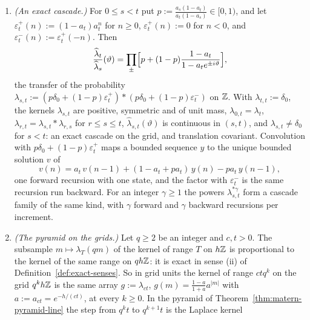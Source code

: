 \begin{proposition}
\[\]
\begin{enumerate}
\item \emph{(An exact cascade.)} For $0 \le s < t$ put
$p := \tfrac{a_s(1-a_t)}{a_t(1-a_s)} \in [0,1)$, and let $\varepsilon^+_t(n) := (1-a_t)a_t^n$ for $n \ge 0$,
$\varepsilon^+_t(n) := 0$ for $n < 0$, and $\varepsilon^-_t(n) := \varepsilon^+_t(-n)$. Then
\begin{equation}
\label{eq:sampled-laplace-increment}
  \frac{\widehat\lambda_t}{\widehat\lambda_s}(\vartheta)
  = \prod_\pm\Bigl[p + (1-p)\frac{1 - a_t}{1 - a_te^{\pm i\vartheta}}\Bigr] ,
\end{equation}
the transfer of the probability
$\lambda_{s,t} := (p\delta_0 + (1-p)\varepsilon^+_t) * (p\delta_0 + (1-p)\varepsilon^-_t)$ on $\mathbb{Z}$. With
$\lambda_{t,t} := \delta_0$, the kernels $\lambda_{s,t}$ are positive, symmetric and of unit mass,
$\lambda_{0,t} = \lambda_t$, $\lambda_{r,t} = \lambda_{s,t} * \lambda_{r,s}$ for $r \le s \le t$,
$\widehat\lambda_{s,t}(\vartheta)$ is continuous in $(s,t)$, and $\lambda_{s,t} \ne \delta_0$ for
$s < t$: an exact cascade on the grid, and translation
covariant. Convolution with
$p\delta_0 + (1-p)\varepsilon^+_t$ maps a bounded sequence $y$ to the unique bounded solution $v$ of
\[
  v(n) = a_t\,v(n-1) + (1 - a_t + pa_t)\,y(n) - pa_t\,y(n-1),
\]
one forward recursion with one state, and the factor with $\varepsilon^-_t$ is the same recursion run
backward. For an integer $\gamma \ge 1$ the powers $\lambda^{*\gamma}_{s,t}$ form a cascade family
of the same kind, with $\gamma$ forward and $\gamma$ backward recursions per increment.
\item \emph{(The \Matern{} pyramid on the grids.)} Let $q \ge 2$ be an integer and $c, t > 0$.
The subsample $m \mapsto \lambda_T(qm)$ of the kernel of range $T$ on $h\mathbb{Z}$ is proportional to the
kernel of the same range on $q h\mathbb{Z}$: it is exact in sense (ii) of
Definition~\ref{def:exact-senses}. So in grid units the kernel of range $ctq^k$ on the grid
$q^kh\mathbb{Z}$ is the same array $g := \lambda_{ct}$, $g(m) = \tfrac{1-a}{1+a}a^{|m|}$ with
$a := a_{ct} = e^{-h/(ct)}$, at every $k \ge 0$. In the \Matern{} pyramid of
Theorem~\ref{thm:matern-pyramid-line} the step from $q^kt$ to $q^{k+1}t$ is the Laplace kernel

\end{enumerate}
\end{proposition}
